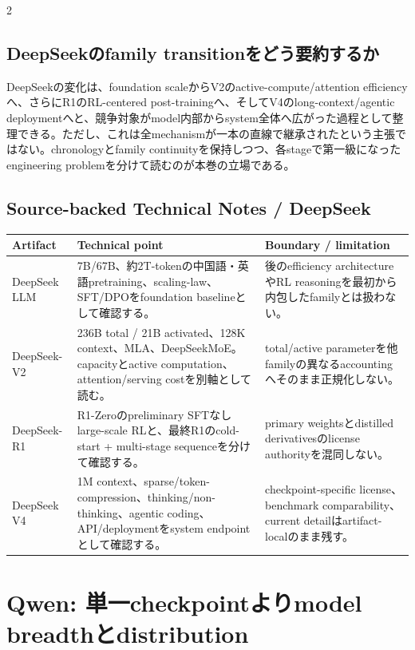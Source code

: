 \documentclass[lualatex,a4paper,10pt]{jlreq}
\begin{document}
\begin{multicols}{2}
\subsection{DeepSeekのfamily transitionをどう要約するか}
DeepSeekの変化は、foundation scaleからV2のactive-compute/attention efficiencyへ、さらにR1のRL-centered post-trainingへ、そしてV4のlong-context/agentic deploymentへと、競争対象がmodel内部からsystem全体へ広がった過程として整理できる。ただし、これは全mechanismが一本の直線で継承されたという主張ではない。chronologyとfamily continuityを保持しつつ、各stageで第一級になったengineering problemを分けて読むのが本巻の立場である。

\end{multicols}

\subsection*{Source-backed Technical Notes / DeepSeek}
\small
\begin{tabularx}{\textwidth}{@{}>{\raggedright\arraybackslash}p{}>{\raggedright\arraybackslash}p{}>{\raggedright\arraybackslash}X@{}}
\toprule
Artifact & Technical point & Boundary / limitation \\
\midrule
DeepSeek LLM & 7B/67B、約2T-tokenの中国語・英語pretraining、scaling-law、SFT/DPOをfoundation baselineとして確認する。 & 後のefficiency architectureやRL reasoningを最初から内包したfamilyとは扱わない。 \\
DeepSeek-V2 & 236B total / 21B activated、128K context、MLA、DeepSeekMoE。capacityとactive computation、attention/serving costを別軸として読む。 & total/active parameterを他familyの異なるaccountingへそのまま正規化しない。 \\
DeepSeek-R1 & R1-Zeroのpreliminary SFTなしlarge-scale RLと、最終R1のcold-start + multi-stage sequenceを分けて確認する。 & primary weightsとdistilled derivativesのlicense authorityを混同しない。 \\
DeepSeek V4 & 1M context、sparse/token-compression、thinking/non-thinking、agentic coding、API/deploymentをsystem endpointとして確認する。 & checkpoint-specific license、benchmark comparability、current detailはartifact-localのまま残す。 \\
\bottomrule
\end{tabularx}
\normalsize
\autocite{deepseekllm,deepseekv2,deepseekr1,deepseekv4}

\section{Qwen: 単一checkpointよりmodel breadthとdistribution}
\label{sec:qwen}
\end{document}
